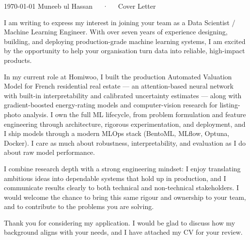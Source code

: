 \documentclass[11pt, a4paper]{awesome-cv}
\begin{document}
\makecvheader[R]

\makecvfooter
  {\today}
  {Muneeb ul Hassan~~~·~~~Cover Letter}
  {}

\makelettertitle

\begin{cvletter}

I am writing to express my interest in joining your team as a Data Scientist / Machine Learning Engineer. With over seven years of experience designing, building, and deploying production-grade machine learning systems, I am excited by the opportunity to help your organisation turn data into reliable, high-impact products.

In my current role at Homiwoo, I built the production Automated Valuation Model for French residential real estate — an attention-based neural network with built-in interpretability and calibrated uncertainty estimates — along with gradient-boosted energy-rating models and computer-vision research for listing-photo analysis. I own the full ML lifecycle, from problem formulation and feature engineering through architecture, rigorous experimentation, and deployment, and I ship models through a modern MLOps stack (BentoML, MLflow, Optuna, Docker). I care as much about robustness, interpretability, and evaluation as I do about raw model performance.

I combine research depth with a strong engineering mindset: I enjoy translating ambitious ideas into dependable systems that hold up in production, and I communicate results clearly to both technical and non-technical stakeholders. I would welcome the chance to bring this same rigour and ownership to your team, and to contribute to the problems you are solving.

Thank you for considering my application. I would be glad to discuss how my background aligns with your needs, and I have attached my CV for your review.

\end{cvletter}


\makeletterclosing
\end{document}
